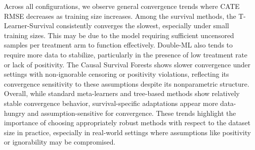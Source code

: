 \documentclass{article} %
\begin{document}
Across all configurations, we observe general convergence trends where CATE RMSE decreases as training size increases. Among the survival methods, the T-Learner-Survival consistently converges the slowest, especially under small training sizes. This may be due to the model requiring sufficient uncensored samples per treatment arm to function effectively. Double-ML also tends to require more data to stabilize, particularly in the presence of low treatment rate or lack of positivity. The Causal Survival Forests shows slower convergence under settings with non-ignorable censoring or positivity violations, reflecting its convergence sensitivity to these assumptions despite its nonparametric structure.
Overall, while standard meta-learners and tree-based methods show relatively stable convergence behavior, survival-specific adaptations appear more data-hungry and assumption-sensitive for convergence. These trends highlight the importance of choosing appropriately robust methods with respect to the dataset size in practice, especially in real-world settings where assumptions like positivity or ignorability may be compromised.
\end{document}
